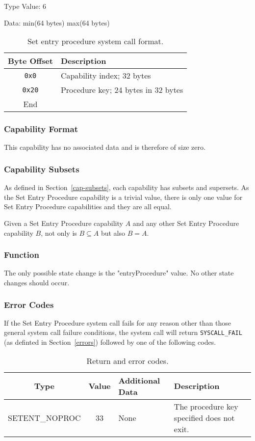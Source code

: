 \documentclass[english,a4paper]{article}
\let\oldparagraph\subsubsection
\renewcommand{\subsubsection}[1]{\oldparagraph{#1}\mbox{}}
\begin{document}
Type Value: 6

Data: min(64 bytes) max(64 bytes)

\begin{table}[H]
  \caption{Set entry procedure system call format.}
  \centering{}%
  \begin{tabularx}{\textwidth}{c|X}
    \hline
    Byte Offset & Description\\
    \hline
    \hline
    \texttt{0x0} & Capability index; 32 bytes \\
    \texttt{0x20} & Procedure key; 24 bytes in 32 bytes \\
    \hline
    End &  \\
    \hline
  \end{tabularx}
\end{table}

\subsubsection{Capability Format}
This capability has no associated data and is therefore of size zero.

\subsubsection{Capability Subsets}
As defined in Section~\ref{cap-subsets}, each capability has subsets and
supersets. As the Set Entry Procedure capability is a trivial value, there is
only one value for Set Entry Procedure capabilities and they are all equal.

Given a Set Entry Procedure capability $A$ and any other Set Entry Procedure
capability $B$, not only is $B \subseteq A$ but also $B = A$.

\subsubsection{Function}
The only possible state change is the "entryProcedure" value. No other state
changes should occur.

\subsubsection{Error Codes}
If the Set Entry Procedure system call fails for any reason other than those
general system call failure conditions, the system call will return
\texttt{SYSCALL\_FAIL} (as definted in Section~\ref{errors}) followed by one of
the following codes.

\begin{table}[H]
  \caption{Return and error codes.}
  \centering{}%
  \begin{tabularx}{\textwidth}{c|c|l|X}
    \hline
    Type & Value & Additional Data & Description \\
    \hline
    \hline
    SETENT\_NOPROC  & 33 & None & The procedure key specified does not exit. \\
    \hline
  \end{tabularx}
\end{table}
\end{document}
